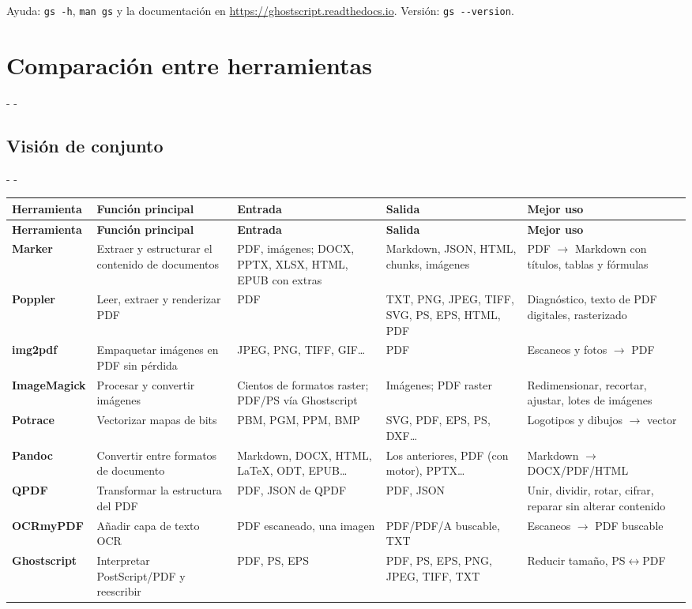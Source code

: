\documentclass[11pt,a4paper]{article}
\makeatletter
\newcommand{\necesitaespacio}[1]{\par\penalty-100\begingroup
	\setlength{\dimen@}{#1}\dimen@ii\pagegoal\advance\dimen@ii-\pagetotal
	\ifdim\dimen@>\dimen@ii\ifdim\dimen@ii>\z@\vfil\fi\penalty-\@M\fi\endgroup}
\newcommand{\cmd}[1]{\texttt{\textcolor{colcmd}{#1}}}      %
\newcommand{\cab}[1]{\textbf{#1}}
\makeatother
\begin{document}
	Ayuda: \cmd{gs -h}, \cmd{man gs} y la documentación en \url{https://ghostscript.readthedocs.io}. Versión: \cmd{gs -{}-version}.
	\clearpage
	\section{Comparación entre herramientas}\label{sec:comparacion}
	
	\necesitaespacio{14\baselineskip}
	\subsection{Visión de conjunto}
	
	\begingroup\footnotesize
	\setlength{\tabcolsep}{4pt}
	\necesitaespacio{10\baselineskip}
	\begin{longtable}{L{2.1cm}L{3.5cm}L{2.9cm}L{2.9cm}L{3.30cm}}
		\toprule{}\cab{Herramienta} & \cab{Función principal} & \cab{Entrada} & \cab{Salida} & \cab{Mejor uso}\\\midrule
		\endfirsthead
		\toprule{}\cab{Herramienta} & \cab{Función principal} & \cab{Entrada} & \cab{Salida} & \cab{Mejor uso}\\\midrule
		\endhead
		\bottomrule
		\endfoot
		\textbf{Marker} & Extraer y estructurar el contenido de documentos & PDF, imágenes; DOCX, PPTX, XLSX, HTML, EPUB con extras & Markdown, JSON, HTML, chunks, imágenes & PDF $\rightarrow$ Markdown con títulos, tablas y fórmulas\\*
		\textbf{Poppler} & Leer, extraer y renderizar PDF & PDF & TXT, PNG, JPEG, TIFF, SVG, PS, EPS, HTML, PDF & Diagnóstico, texto de PDF digitales, rasterizado\\
		\textbf{img2pdf} & Empaquetar imágenes en PDF sin pérdida & JPEG, PNG, TIFF, GIF\ldots & PDF & Escaneos y fotos $\rightarrow$ PDF\\
		\textbf{ImageMagick} & Procesar y convertir imágenes & Cientos de formatos raster; PDF/PS vía Ghostscript & Imágenes; PDF raster & Redimensionar, recortar, ajustar, lotes de imágenes\\
		\textbf{Potrace} & Vectorizar mapas de bits & PBM, PGM, PPM, BMP & SVG, PDF, EPS, PS, DXF\ldots & Logotipos y dibujos $\rightarrow$ vector\\
		\textbf{Pandoc} & Convertir entre formatos de documento & Markdown, DOCX, HTML, LaTeX, ODT, EPUB\ldots & Los anteriores, PDF (con motor), PPTX\ldots & Markdown $\rightarrow$ DOCX/PDF/HTML\\
		\textbf{QPDF} & Transformar la estructura del PDF & PDF, JSON de QPDF & PDF, JSON & Unir, dividir, rotar, cifrar, reparar sin alterar contenido\\
		\textbf{OCRmyPDF} & Añadir capa de texto OCR & PDF escaneado, una imagen & PDF/PDF/A buscable, TXT & Escaneos $\rightarrow$ PDF buscable\\*
		\textbf{Ghostscript} & Interpretar PostScript/PDF y reescribir & PDF, PS, EPS & PDF, PS, EPS, PNG, JPEG, TIFF, TXT & Reducir tamaño, PS$\leftrightarrow$PDF\\
	\end{longtable}
	\endgroup
	
\end{document}
